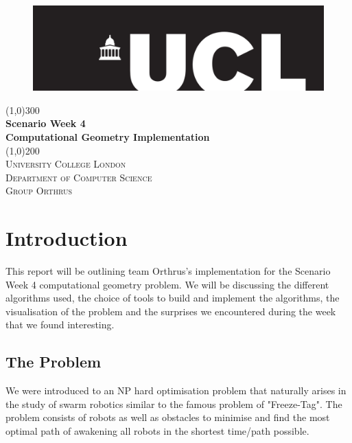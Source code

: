 \documentclass[12pt]{article}
\begin{document}
\begin{titlepage}
\begin{center}
\begin{figure}[t]
\hspace*{0.35cm}\includegraphics[width=1.0\textwidth]{uclLogo}\\
\end{figure}
\line(1,0){300}\\
[0.25in]
\huge{\bfseries Scenario Week 4 }\\
\huge{\bfseries Computational Geometry Implementation }\\
[2mm]
\line(1,0){200}\\
[1.5cm]
\textsc{\LARGE University College London}\\
\textsc{\normalsize Department of Computer Science}\\
\textsc{\normalsize Group Orthrus}\\
[5cm]
\end{center}

\end{titlepage}
\tableofcontents

\newpage
\section{Introduction}\label{sec:abstract}
This report will be outlining team Orthrus's implementation for the Scenario Week 4 computational geometry problem. We will be discussing the different algorithms used, the choice of tools to build and implement the algorithms, the visualisation of the problem and the surprises we encountered during the week that we found interesting. 

\subsection{The Problem}\label{sec:theProblem}
We were introduced to an NP hard optimisation problem that naturally arises in the study of swarm robotics similar to the famous problem of "Freeze-Tag". The problem consists of robots as well as obstacles to minimise and find the most optimal path of awakening all robots in the shortest time/path possible.
\end{document}
